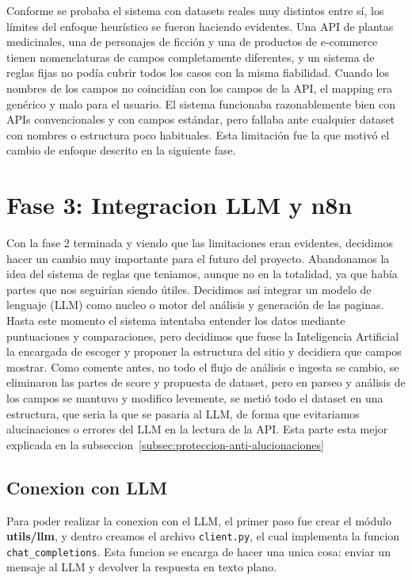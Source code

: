 Conforme se probaba el sistema con datasets reales muy distintos entre sí, los límites del enfoque heurístico se fueron haciendo evidentes. Una API de plantas medicinales, una de personajes de ficción y una de productos de e-commerce tienen nomenclaturas de campos completamente diferentes, y un sistema de reglas fijas no podía cubrir todos los casos con la misma fiabilidad. Cuando los nombres de los campos no coincidían con los campos de la API, el mapping era genérico y malo para el usuario. El sistema funcionaba razonablemente bien con APIs convencionales y con campos estándar, pero fallaba ante cualquier dataset con nombres o estructura poco habituales. Esta limitación fue la que motivó el cambio de enfoque descrito en la siguiente fase.


\section{Fase 3: Integracion LLM y n8n}
\label{sec:integracion-llm-n8n}

Con la fase 2 terminada y viendo que las limitaciones eran evidentes, decidimos hacer un cambio muy importante para el futuro del proyecto. Abandonamos 
la idea del sistema de reglas que teniamos, aunque no en la totalidad, ya que había partes que nos seguirían siendo útiles. Decidimos así integrar un
modelo de lenguaje (LLM) como nucleo o motor del análisis y generación de las paginas. Hasta este momento el sistema intentaba entender los datos mediante
puntuaciones y comparaciones, pero decidimos que fuese la Inteligencia Artificial la encargada de escoger y proponer la estructura del sitio y decidiera que 
campos mostrar. Como comente antes, no todo el flujo de análisis e ingesta se cambio, se eliminaron las partes de score y propuesta de dataset, pero en parseo 
y análisis de los campos se mantuvo y modifico levemente, se metió todo el dataset en una estructura, que seria la que se pasaria al LLM, de forma que evitariamos
alucinaciones o errores del LLM en la lectura de la API. Esta parte esta mejor explicada en la subseccion~\ref{subsec:proteccion-anti-alucionaciones}


\subsection{Conexion con LLM}
\label{subsec:conexion-llm}

Para poder realizar la conexion con el LLM, el primer paso fue crear el módulo \textbf{utils/llm}, y dentro creamos el archivo \texttt{client.py}, el cual
implementa la funcion \texttt{chat\_completions}. Esta funcion se encarga de hacer una unica cosa: enviar un mensaje al LLM y devolver la respuesta en texto
plano.

